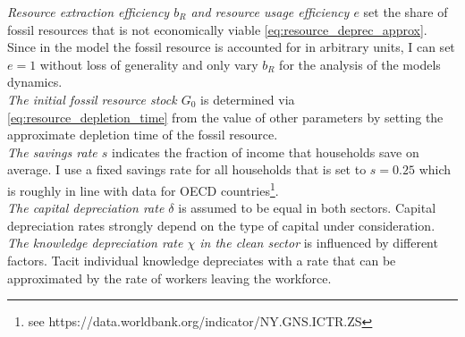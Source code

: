 \textit{Resource extraction efficiency $b_R$ and resource usage efficiency $e$} set the share of fossil resources that is not economically viable \eqref{eq:resource_deprec_approx}. Since in the model the fossil resource is accounted for in arbitrary units, I can set $e=1$ without loss of generality and only vary $b_R$ for the analysis of the models dynamics.\\

\textit{The initial fossil resource stock $G_0$} is determined via \eqref{eq:resource_depletion_time} from the value of other parameters by setting the approximate depletion time of the fossil resource.\\

\textit{The savings rate $s$} indicates the fraction of income that households save on average. I use a fixed savings rate for all households that is set to $s=0.25$ which is roughly in line with data for OECD countries\footnote{see https://data.worldbank.org/indicator/NY.GNS.ICTR.ZS}.\\

\textit{The capital depreciation rate $\delta$} is assumed to be equal in both sectors. Capital depreciation rates strongly depend on the type of capital under consideration.\\

\textit{The knowledge depreciation rate $\chi$ in the clean sector} is influenced by different factors. Tacit individual knowledge depreciates with a rate that can be approximated by the rate of workers leaving the workforce. 

\iffalse
